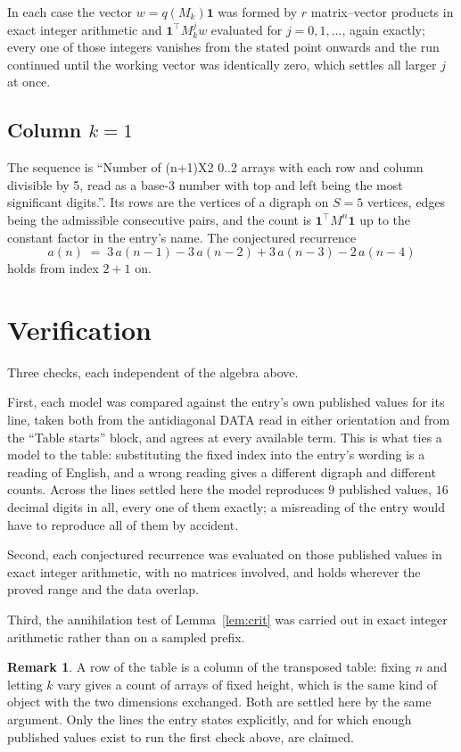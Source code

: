 \documentclass[11pt,a4paper]{article}
\theoremstyle{plain}
\theoremstyle{definition}
\newtheorem{remark}[theorem]{Remark}
\begin{document}
In each case the vector $w=q(M_k)\mathbf{1}$ was formed by $r$ matrix--vector products in
exact integer arithmetic and $\mathbf{1}^{\!\top}M_k^{j}w$ evaluated for $j=0,1,\dots$,
again exactly; every one of those integers vanishes from the stated point onwards and the run
continued until the working vector was identically zero, which settles all larger $j$ at once.

\subsection*{Column $k$$=1$}
The sequence is ``Number of (n+1)X2 0..2 arrays with each row and column divisible by 5, read as a base-3 number with top and left being the most significant digits.''. Its rows are the vertices of a digraph on
$S=5$ vertices, edges being the admissible consecutive pairs, and the count is
$\mathbf{1}^{\!\top}M^{n}\mathbf{1}$ up to the constant factor in the entry's name.
The conjectured recurrence
\[
a(n)\;=\;3\,a(n-1) - 3\,a(n-2) + 3\,a(n-3) - 2\,a(n-4)
\]
holds from index $2+1$ on.

\section{Verification}

Three checks, each independent of the algebra above.

First, each model was compared against the entry's own published values for its line, taken
both from the antidiagonal DATA read in either orientation and from the ``Table starts''
block, and agrees at every available term. This is what ties a model to the table:
substituting the fixed index into the entry's wording is a reading of English, and a wrong
reading gives a different digraph and different counts. Across the lines settled here the
model reproduces $9$ published values, $16$ decimal digits in all, every one of
them exactly; a misreading of the entry would have to reproduce all of them by accident.

Second, each conjectured recurrence was evaluated on those published values in exact
integer arithmetic, with no matrices involved, and holds wherever the proved range and the
data overlap.

Third, the annihilation test of Lemma~\ref{lem:crit} was carried out in exact integer
arithmetic rather than on a sampled prefix.

\begin{remark}
A row of the table is a column of the transposed table: fixing $n$ and letting $k$ vary gives a
count of arrays of fixed height, which is the same kind of object with the two dimensions
exchanged. Both are settled here by the same argument. Only the lines the entry states
explicitly, and for which enough published values exist to run the first check above, are
claimed.
\end{remark}
\end{document}
